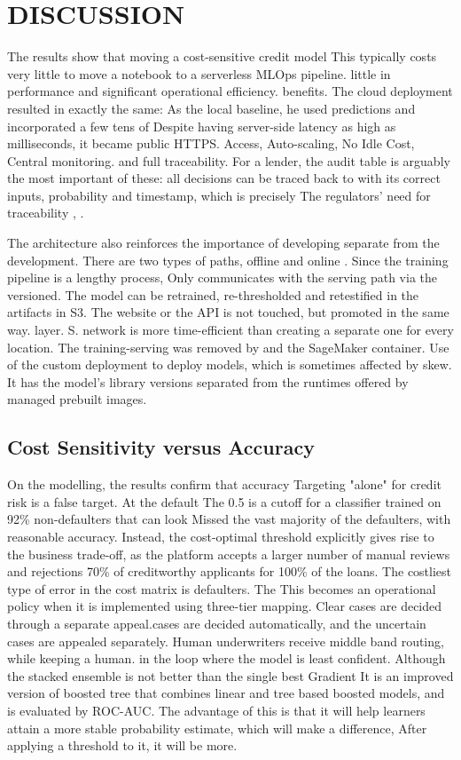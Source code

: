 \documentclass[conference]{IEEEtran}
\begin{document}
\section{DISCUSSION}
The results show that moving a cost-sensitive credit model
This typically costs very little to move a notebook to a serverless MLOps pipeline.
little in performance and significant operational efficiency.
benefits. The cloud deployment resulted in exactly the same:
As the local baseline, he used predictions and incorporated a few tens of
Despite having server-side latency as high as milliseconds, it became public HTTPS.
Access, Auto-scaling, No Idle Cost, Central monitoring.
and full traceability. For a lender, the audit table is arguably
the most important of these: all decisions can be traced back to
with its correct inputs, probability and timestamp, which is precisely
The regulators' need for traceability \cite{12}, \cite{15}.

The architecture also reinforces the importance of developing separate from the development.
There are two types of paths, offline and online \cite{6}. Since the training pipeline is a lengthy process,
Only communicates with the serving path via the versioned.
The model can be retrained, re-thresholded and retestified in the artifacts in S3.
The website or the API is not touched, but promoted in the same way.
layer. S. network is more time-efficient than creating a separate one for every location.
The training-serving was removed by and the SageMaker container.
Use of the custom deployment to deploy models, which is sometimes affected by skew.
It has the model's library versions separated from the
runtimes offered by managed prebuilt images.

\subsection{Cost Sensitivity versus Accuracy}
On the modelling, the results confirm that accuracy
Targeting "alone" for credit risk is a false target. At the default
The 0.5 is a cutoff for a classifier trained on 92\% non-defaulters that can look
Missed the vast majority of the defaulters, with reasonable accuracy. Instead, the cost-optimal threshold explicitly gives rise to the business trade-off, as the platform
accepts a larger number of manual reviews and rejections
70\% of creditworthy applicants for 100\% of the loans.
The costliest type of error in the cost matrix is defaulters. The
This becomes an operational policy when it is implemented using three-tier mapping. Clear
cases are decided through a separate appeal.cases are decided automatically, and the uncertain cases are appealed separately.
Human underwriters receive middle band routing, while keeping a human.
in the loop where the model is least confident. Although
the stacked ensemble is not better than the single best Gradient
It is an improved version of boosted tree that combines linear and tree based boosted models, and is evaluated by ROC-AUC.
The advantage of this is that it will help learners attain a more stable probability estimate, which will make a difference,
After applying a threshold to it, it will be more.
\end{document}

